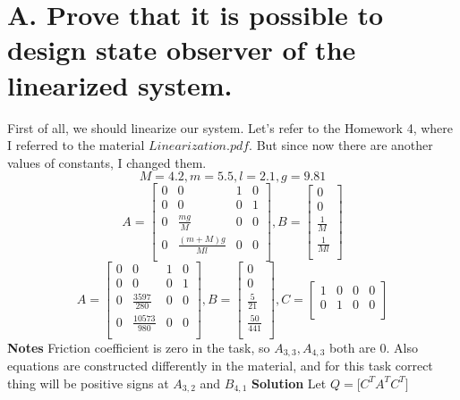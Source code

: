 \documentclass[a4paper,11pt]{article}
\theoremstyle{mytheor}
\begin{document}
\section*{A. Prove that it is possible to design state observer of the linearized system.}
First of all, we should linearize our system. Let's refer to the Homework 4, where I referred to the material $Linearization.pdf$. But since now there are another values of constants, I changed them.
\[
M=4.2,m=5.5,l=2.1,g=9.81
\]
\[
A=
\begin{bmatrix}
0&0&1&0\\
0&0&0&1\\
0&\frac{mg}{M}&0&0\\
0&\frac{(m+M)g}{Ml}&0&0\\
\end{bmatrix}
,B=
\begin{bmatrix}
0\\
0\\
\frac{1}{M}\\
\frac{1}{Ml}\\
\end{bmatrix}
\]
\[
A=
\begin{bmatrix}
0&0&1&0\\
0&0&0&1\\
0&\frac{3597}{280}&0&0\\
0&\frac{10573}{980}&0&0\\
\end{bmatrix}
,B=
\begin{bmatrix}
0\\
0\\
\frac{5}{21}\\
\frac{50}{441}\\
\end{bmatrix}
,C=
\begin{bmatrix}
1&0&0&0\\
0&1&0&0\\
\end{bmatrix}
\]
\textbf{Notes}\newline
Friction coefficient is zero in the task, so $A_{3,3}, A_{4,3}$ both are $0$.\newline
Also equations are constructed differently in the material, and for this task correct thing will be positive signs at $A_{3,2}$ and $B_{4,1}$\newline
\textbf{Solution}\newline
Let $Q=[C^{T}$\space\space$A^{T}C^{T}]$\newline
\end{document}

